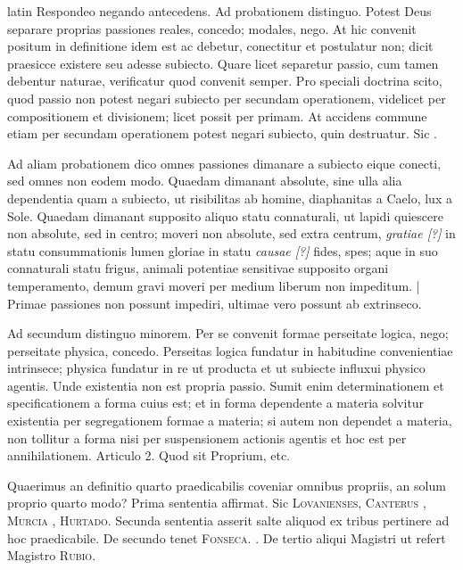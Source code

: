 \begin{otherlanguage*}{latin}
\pstart
  Respondeo negando antecedens. Ad probationem distinguo. Potest Deus separare proprias passiones reales, concedo; modales, nego. At hic convenit positum in definitione idem est ac debetur, conectitur et postulatur non; dicit praesicce existere seu adesse subiecto. Quare licet separetur passio, cum tamen debentur naturae, verificatur quod convenit semper. Pro speciali doctrina scito, quod passio non potest negari subiecto per secundam operationem, videlicet per compositionem et divisionem; licet possit per primam. At accidens commune etiam per secundam operationem potest negari subiecto, quin destruatur. Sic . 
\pend

\pstart
  Ad aliam probationem dico omnes passiones dimanare a subiecto eique conecti, sed omnes non eodem modo. Quaedam dimanant absolute, sine ulla alia dependentia quam a subiecto, ut risibilitas ab homine, diaphanitas a Caelo, lux a Sole. Quaedam dimanant supposito aliquo statu connaturali, ut lapidi quiescere non absolute, sed in centro; moveri non absolute, sed extra centrum, \emph{gratiae [?]} in statu consummationis lumen gloriae in statu \emph{causae [?]} fides, spes; aque in suo connaturali statu frigus, animali potentiae sensitivae supposito organi temperamento, demum gravi moveri per medium liberum non impeditum. \textnormal{|}   Primae passiones non possunt impediri, ultimae vero possunt ab extrinseco. 
\pend

\pstart
  Ad secundum distinguo minorem. Per se convenit formae perseitate logica, nego; perseitate physica, concedo. Perseitas logica fundatur in habitudine convenientiae intrinsece; physica fundatur in re ut producta et ut subiecte influxui physico agentis. Unde existentia non est propria passio. Sumit enim determinationem et specificationem a forma cuius est; et in forma dependente a materia solvitur existentia per segregationem formae a materia; si autem non dependet a materia, non tollitur a forma nisi per suspensionem actionis agentis et hoc est per annihilationem. Articulo 2. Quod sit Proprium, etc. 
\pend

        \pstart
        \pend
      
\pstart
  Quaerimus an definitio quarto praedicabilis coveniar omnibus propriis, an solum proprio quarto modo? Prima sententia affirmat. Sic \textsc{Lovanienses}\index[persons]{}, \textsc{Canterus} , \textsc{Murcia} , \textsc{Hurtado}\index[persons]{}. Secunda sententia asserit salte aliquod ex tribus pertinere ad hoc praedicabile. De secundo tenet \textsc{Fonseca}. . De tertio aliqui Magistri ut refert Magistro \textsc{Rubio}. 
\pend


\end{otherlanguage*}

